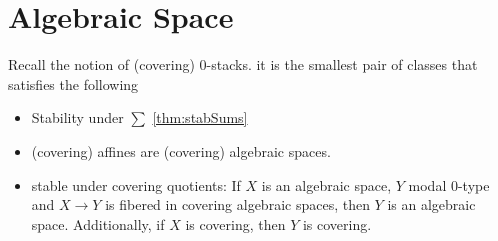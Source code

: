 \section{Algebraic Space}
Recall the notion of (covering) 0-stacks. it is the smallest pair of classes that satisfies the following
\begin{itemize}
	\item Stability under $\sum$ \ref{thm:stabSums} 
	\item (covering) affines are (covering) algebraic spaces. %
	\item stable under covering quotients: If $X$ is an algebraic space, $Y$ modal 0-type and $X \to Y$ is fibered in covering algebraic spaces, then $Y$ is an algebraic space. Additionally, if $X$ is covering, then $Y$ is covering.
\end{itemize}
